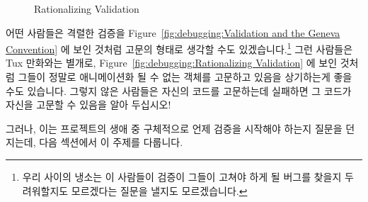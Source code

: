 \begin{figure}[tb]
\centering
{}
\caption{Rationalizing Validation}
\end{figure}

어떤 사람들은 격렬한 검증을
Figure~\ref{fig:debugging:Validation and the Geneva Convention}
에 보인 것처럼 고문의 형태로 생각할 수도 있겠습니다.\footnote{
	우리 사이의 냉소는 이 사람들이 검증이 그들이 고쳐야 하게 될 버그를
	찾을지 두려워할지도 모르겠다는 질문을 낼지도 모르겠습니다.}
그런 사람들은 Tux 만화와는 별개로,
Figure~\ref{fig:debugging:Rationalizing Validation} 에 보인 것처럼 그들이
정말로 애니메이션화 될 수 없는 객체를 고문하고 있음을 상기하는게 좋을 수도
있습니다.
그렇지 않은 사람들은 자신의 코드를 고문하는데 실패하면 그 코드가 자신을 고문할
수 있음을 알아 두십시오!

그러나, 이는 프로젝트의 생애 중 구체적으로 언제 검증을 시작해야 하는지 질문을
던지는데, 다음 섹션에서 이 주제를 다룹니다.

